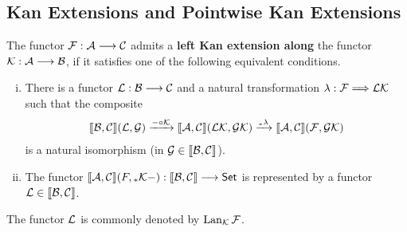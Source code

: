 	\subsection{Kan Extensions and Pointwise Kan Extensions}

	\begin{definition}
		The functor $\mathcal{F}:\mathcal{A} --> \mathcal{C}$ admits a \textbf{left Kan extension along} the functor $\mathcal{K}:\mathcal{A} --> \mathcal{B}$, if it satisfies one of the following equivalent conditions.
		\begin{enumerate}[(i)]
			\item{
				There is a functor $\mathcal{L}:\mathcal{B}--> \mathcal{C}$ and a natural transformation $\lambda: \mathcal{F} ==> \mathcal{LK}$ such that the composite
				\begin{align*}
					|[\mathcal{B},\mathcal{C}|](\mathcal{L},\mathcal{G}) \xrightarrow{-\circ \mathcal{K}} |[\mathcal{A},\mathcal{C}|](\mathcal{LK},\mathcal{GK}) \xrightarrow{{}_{*}\lambda}|[\mathcal{A},\mathcal{C}|](\mathcal{F},\mathcal{GK})
				\end{align*}
				is a natural isomorphism (in $\mathcal{G} \in |[\mathcal{B},\mathcal{C}|]$).

			}
			\item{
				The functor $|[\mathcal{A},\mathcal{C}|](F,{}_{*}\mathcal{K}-):|[\mathcal{B},\mathcal{C}|] --> \textsf{Set}$ is represented by a functor $\mathcal{L} \in |[\mathcal{B},\mathcal{C}|]$.
			}
		\end{enumerate}
		The functor $\mathcal{L}$ is commonly denoted by $\operatorname{Lan}_{\mathcal{K}}\mathcal{F}$.
	\end{definition}

	\begin{lemma}


	\end{lemma}

